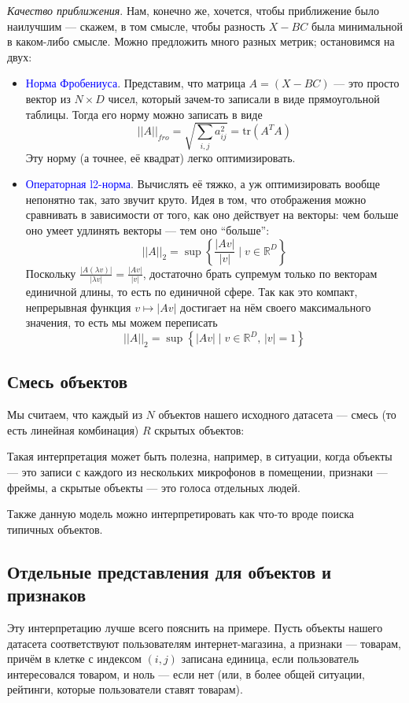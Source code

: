 \documentclass{amsart}
\theoremstyle{definition}
\theoremstyle{remark}
\numberwithin{equation}{section}
\begin{document}
\textit{Качество приближения}. Нам, конечно же, хочется, чтобы приближение было наилучшим --- скажем, в том смысле, чтобы разность $X - BC$ была минимальной в каком-либо смысле. Можно предложить много разных метрик; остановимся на двух:
\begin{itemize}
\item \textcolor{blue}{Норма Фробениуса}. Представим, что матрица $A = (X - BC)$ --- это просто вектор из $N\times D$ чисел, который зачем-то записали в виде прямоугольной таблицы. Тогда его норму можно записать в виде
$$||A||_{fro} = \sqrt{\sum_{i,j}a_{ij}^2} = \mathrm{tr}\left(A^TA\right)$$
Эту норму (а точнее, её квадрат) легко оптимизировать.
\item \textcolor{blue}{Операторная  l2-норма}. Вычислять её тяжко, а уж оптимизировать вообще непонятно так, зато звучит круто. Идея в том, что отображения можно сравнивать в зависимости от того, как оно действует на векторы: чем больше оно умеет удлинять векторы --- тем оно ``больше'':
$$||A||_2 = \sup\left\{\frac{|Av|}{|v|}\mid v\in\mathbb{R}^D\right\}$$
Поскольку $\frac{|A(\lambda v)|}{|\lambda v|} = \frac{|Av|}{|v|}$, достаточно брать супремум только по векторам единичной длины, то есть по единичной сфере. Так как это компакт, непрерывная функция $v\mapsto |Av|$ достигает на нём своего максимального значения, то есть мы можем переписать
$$||A||_2 = \sup\left\{|Av|\mid v\in\mathbb{R}^D,\,|v| = 1\right\}$$
\end{itemize}

\subsection{Смесь объектов} Мы считаем, что каждый из $N$ объектов нашего исходного датасета --- смесь (то есть линейная комбинация) $R$ скрытых объектов:

\begin{center}
\end{center}

Такая интерпретация может быть полезна, например, в ситуации, когда объекты --- это записи с каждого из нескольких микрофонов в помещении, признаки --- фреймы, а скрытые объекты --- это голоса отдельных людей.

Также данную модель можно интерпретировать как что-то вроде поиска типичных объектов.

\subsection{Отдельные представления для объектов и признаков} Эту интерпретацию лучше всего пояснить на примере. Пусть объекты нашего датасета соответствуют пользователям интернет-магазина, а признаки --- товарам, причём в клетке с индексом $(i,j)$ записана единица, если пользователь интересовался товаром, и ноль --- если нет (или, в более общей ситуации, рейтинги, которые пользователи ставят товарам).
\end{document}
